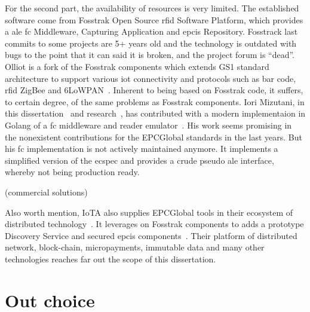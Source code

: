 For the second part, the availability of resources is very limited.
The established software come from Fosstrak Open Source \ac{rfid} Software Platform, which provides a \ac{ale} \ac{fc} Middleware, Capturing Application and \ac{epcis} Repository. Fosstrack last commits to some projects are 5+ years old and the technology is outdated with bugs to the point that it can said it is broken, and the project forum is ``dead''.
Olliot is a fork of the Fosstrak components which extends GS1 standard architecture to support various \ac{iot} connectivity and protocols such as bar code, \ac{rfid} ZigBee and 6LoWPAN~\cite{OpenLanguageInternet}. Inherent to being based on Fosstrak code, it suffers, to certain degree, of the same problems as Fosstrak components.
Iori Mizutani, in this dissertation~\cite{mizutaniRobustHighPerformance} and research~\cite{mizutaniMulticodePortableRFID2016b}, has contributed with a modern implementaion in Golang of a \ac{fc} middleware and reader emulator~\cite{mizutaniIomzGolemu2020, mizutaniIomzGosstrak2020}. His work seems promising in the nonexistent contributions for the EPCGlobal standards in the last years. But his \ac{fc} implementation is not actively maintained anymore. It implements a simplified version of the \ac{ecspec} and provides a crude pseudo \ac{ale} interface, whereby not being production ready.

(commercial solutions)

Also worth mention, IoTA also supplies EPCGlobal tools in their ecosystem of distributed technology~\cite{GlobalTradeSupply}. It leverages on Fosstrak components to adds a prototype Discovery Service and secured \ac{epcis} components~\cite{FosstrakSimilarProjects}. Their platform of distributed network, block-chain, micropayments, immutable data and many other technologies reaches far out the scope of this dissertation.

\section{Out choice} \label{sec:ourchoice}
